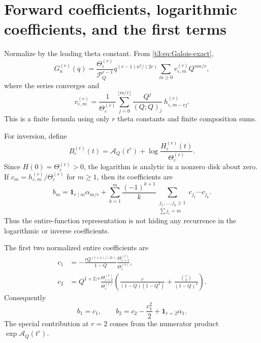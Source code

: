 \documentclass[11pt,openany]{book}
\numberwithin{equation}{chapter}
\theoremstyle{plain}
\theoremstyle{definition}
\theoremstyle{remark}
\newcommand{\pp}[1]{(Q;Q)_{#1}}
\newcommand{\Pinf}{\mathcal P_Q}
\newcommand{\A}{\mathcal A_Q}
\newcommand{\eps}{\varepsilon}
\newcommand{\T}{\Theta}
\newcommand{\one}{\mathbf 1}
\begin{document}
\section{Forward coefficients, logarithmic coefficients, and the first terms}

Normalize by the leading theta constant. From \eqref{t3:eq:Galois-exact},
\begin{equation}\label{t3:eq:Galois-forward-normalized}
 G_n^{(r)}(q)=\frac{\T_{\eps}^{(r)}}{\Pinf^{r-1}}
 q^{(r-1)n^2/(2r)}\sum_{m\ge0}v_{\eps,m}^{(r)}Q^{mn/r},
\end{equation}
where the series converges and
\begin{equation}\label{t3:eq:Galois-v}
 v_{\eps,m}^{(r)}=
 \frac1{\T_{\eps}^{(r)}}
 \sum_{j=0}^{\lfloor m/r\rfloor}
 \frac{Q^j}{\pp{j}}\,h_{\eps,m-rj}^{(r)}.
\end{equation}
This is a finite formula using only $r$ theta constants and finite composition sums.

For inversion, define
\begin{equation}\label{t3:eq:Galois-B}
 B_{\eps}^{(r)}(t)=\A(t^r)+
       \log\frac{H_{\eps}^{(r)}(t)}{\T_{\eps}^{(r)}}.
\end{equation}
Since $H(0)=\T_{\eps}^{(r)}>0$, the logarithm is analytic in a nonzero disk about zero. If
$c_m=h_{\eps,m}^{(r)}/\T_{\eps}^{(r)}$ for $m\ge1$, then its coefficients are
\begin{equation}\label{t3:eq:Galois-b}
 b_m=\one_{r\mid m}\alpha_{m/r}
 +\sum_{k=1}^m\frac{(-1)^{k+1}}k
  \sum_{\substack{j_1,\ldots,j_k\ge1\\\sum j_i=m}}
       c_{j_1}\cdots c_{j_k}.
\end{equation}
Thus the entire-function representation is not hiding any recurrence in the logarithmic or inverse coefficients.

The first two normalized entire coefficients are
\begin{align}
 c_1&=-\frac{rQ^{(r+1)/(2r)}}{1-Q}
               \frac{\T_{\eps+1}^{(r)}}{\T_{\eps}^{(r)}},
 \label{t3:eq:Galois-c1}\\
 c_2&=Q^{1+2/r}\frac{\T_{\eps+2}^{(r)}}{\T_{\eps}^{(r)}}
 \left(\frac r{(1-Q)(1-Q^2)}
       +\frac{\binom r2}{(1-Q)^2}\right).
 \label{t3:eq:Galois-c2}
\end{align}
Consequently
\begin{equation}\label{t3:eq:Galois-b12}
 b_1=c_1,\qquad b_2=c_2-\frac{c_1^2}2+\one_{r=2}\alpha_1.
\end{equation}
The special contribution at $r=2$ comes from the numerator product $\exp\A(t^r)$.
\end{document}
